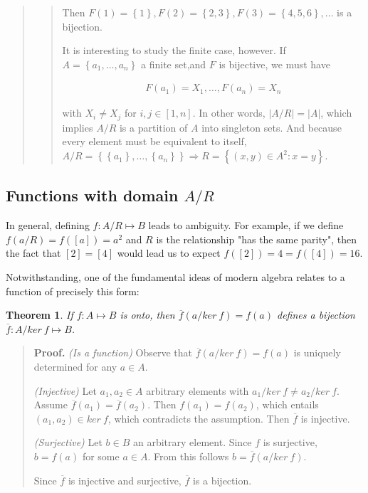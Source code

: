 \documentclass[a4paper, 12pt]{article}
\newtheorem{theorem}{Theorem}
\newtheorem{theorem}{Theorem}
\begin{document}
\begin{quote}
\begin{quote}
    Then $F(1) = \left\{ 1 \right\} , F(2) = \left\{ 2, 3 \right\}, F(3) =
    \left\{ 4, 5, 6 \right\}, \ldots  $ is a bijection.

    It is interesting to study the finite case, however. If $A = \left\{ a_1,
    \ldots, a_n \right\} $ a finite set,and $F$ is bijective, we must have

    \begin{align*}
        F(a_1) = X_1, \ldots, F(a_{n}) = X_{n}
    \end{align*}

    with $X_i \neq X_j$ for $i, j \in [1, n]$. In other words, $|A / R| = |A|$, which implies $A / R$
    is a partition of $A$ into singleton sets. And because every element must be
    equivalent to itself, $A / R = \left\{ \left\{ a_1 \right\}, \ldots, \left\{
    a_n\right\}   \right\} \Rightarrow R = \left\{ (x, y) \in A^2 : x = y
    \right\} $.


\end{quote}

\end{quote}
\normalsize



\subsection{Functions with domain $A / R$}

In general, defining $f : A / R \mapsto B$ leads to ambiguity. For example, if
we define $f(a / R) = f([a]) = a^2$ and $R$ is the relationship "has the same
parity", then the fact that $[2] = [4]$ would lead us to expect $f([2]) = 4 =
f([4]) = 16$.

Notwithstanding, one of the fundamental ideas of modern algebra relates to a
function of precisely this form:

\begin{theorem}
    If $f : A \mapsto B$ is onto, then $\overline{f}(a / ker ~ f) = f(a)$
    defines a bijection $\overline{f} : A / ker ~ f \mapsto B$.
\end{theorem}


\small
\begin{quote}

\textbf{Proof.} \textit{(Is a function)} Observe that $\overline{f}(a / ker ~ f) = f(a)$
is uniquely determined for any $a \in A$.

\textit{(Injective)} Let $a_1, a_2 \in A$ arbitrary elements
with $a_1 / ker ~ f \neq a_2 / ker ~ f$. Assume $\overline{f}(a_1) =
\overline{f}(a_2)$. Then $f(a_1) = f(a_2)$, which entails $(a_1, a_2) \in ker ~
f$, which contradicts the assumption. Then $\overline{f}$ is injective.

\textit{(Surjective)} Let $b \in B$ an arbitrary element. Since $f$ is
surjective, $b = f(a)$ for some $a \in A$. From this follows $b = \overline{f}(a
/ ker ~ f)$. 

Since $\overline{f}$ is injective and surjective, $\overline{f}$ is a bijection.

\end{quote}
\normalsize
\end{document}
